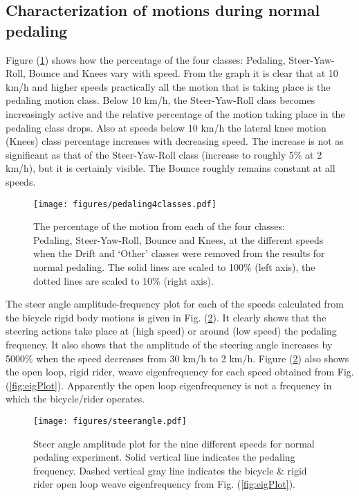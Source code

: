\subsection{Characterization of motions during normal pedaling}
\label{sec:normalPed}
Figure (\ref{jellybean}) shows how the percentage of the four classes:
Pedaling, Steer-Yaw-Roll, Bounce and Knees vary with speed. From the graph it
is clear that at 10 km/h and higher speeds practically all the motion that is
taking place is the pedaling motion class. Below 10 km/h, the Steer-Yaw-Roll
class becomes increasingly active and the relative percentage of the motion
taking place in the pedaling class drops. Also at speeds below 10 km/h the
lateral knee motion (Knees) class percentage increases with decreasing speed.
The increase is not as significant as that of the Steer-Yaw-Roll class
(increase to roughly 5\% at 2 km/h), but it is certainly visible. The Bounce
roughly remains constant at all speeds.
\begin{figure}[]
    \centering
    \texttt{[image: figures/pedaling4classes.pdf]}
    \caption{The percentage of the motion from each of the four classes:
    Pedaling, Steer-Yaw-Roll, Bounce and Knees, at the different speeds when
    the Drift and `Other' classes were removed from the results for normal
    pedaling. The solid lines are scaled to 100\% (left axis), the dotted lines
    are scaled to 10\% (right axis).}
    \label{jellybean}
\end{figure}

The steer angle amplitude-frequency plot for each of the speeds calculated from
the bicycle rigid body motions is given in Fig. (\ref{pedalsteerangle}). It
clearly shows that the steering actions take place at (high speed) or around
(low speed) the pedaling frequency. It also shows that the amplitude of the
steering angle increases by 5000\% when the speed decreases from 30 km/h to 2
km/h. Figure (\ref{pedalsteerangle}) also shows the open loop, rigid rider,
weave eigenfrequency for each speed obtained from Fig. (\ref{fig:eigPlot}).
Apparently the open loop eigenfrequency is not a frequency in which the
bicycle/rider operates.
\begin{figure}[tb]
    \centering
        \texttt{[image: figures/steerangle.pdf]}\\
    \caption{Steer angle amplitude plot for the nine different speeds for
    normal pedaling experiment. Solid vertical line indicates the pedaling
    frequency. Dashed vertical gray line indicates the bicycle \& rigid rider
    open loop weave eigenfrequency from Fig. (\ref{fig:eigPlot}).}
    \label{pedalsteerangle}
\end{figure}
